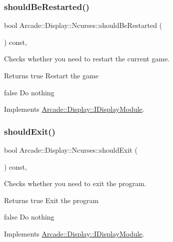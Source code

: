 \subsubsection{\texorpdfstring{shouldBeRestarted()}{shouldBeRestarted()}}
{\footnotesize\ttfamily bool Arcade\+::\+Display\+::\+Ncurses\+::should\+Be\+Restarted (\begin{DoxyParamCaption}{ }\end{DoxyParamCaption}) const\hspace{0.3cm}{\ttfamily [final]}, {\ttfamily [virtual]}}



Checks whether you need to restart the current game. 

\begin{DoxyReturn}{Returns}
true Restart the game 

false Do nothing 
\end{DoxyReturn}


Implements \mbox{\hyperlink{classArcade_1_1Display_1_1IDisplayModule_adc5d499229aa5899bbd4bae14f00cb27}{Arcade\+::\+Display\+::\+I\+Display\+Module}}.

\mbox{\label{classArcade_1_1Display_1_1Ncurses_a6d27fa12cb2086a3ded2f40462c5ddab}} 
\subsubsection{\texorpdfstring{shouldExit()}{shouldExit()}}
{\footnotesize\ttfamily bool Arcade\+::\+Display\+::\+Ncurses\+::should\+Exit (\begin{DoxyParamCaption}{ }\end{DoxyParamCaption}) const\hspace{0.3cm}{\ttfamily [final]}, {\ttfamily [virtual]}}



Checks whether you need to exit the program. 

\begin{DoxyReturn}{Returns}
true Exit the program 

false Do nothing 
\end{DoxyReturn}


Implements \mbox{\hyperlink{classArcade_1_1Display_1_1IDisplayModule_a550877fb92d58325404b9ebe9e71f6ff}{Arcade\+::\+Display\+::\+I\+Display\+Module}}.

